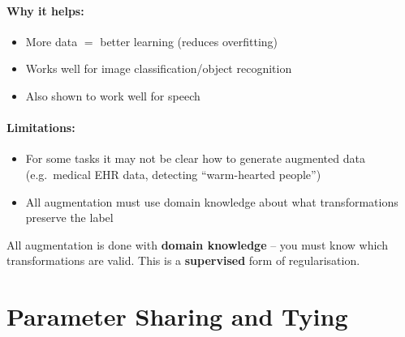 \documentclass[12pt,a4paper]{article}
\begin{document}
\paragraph{Why it helps:}
\begin{itemize}
  \item More data $=$ better learning (reduces overfitting)
  \item Works well for image classification/object recognition
  \item Also shown to work well for speech
\end{itemize}

\paragraph{Limitations:}
\begin{itemize}
  \item For some tasks it may not be clear how to generate augmented data (e.g.\ medical EHR data, detecting ``warm-hearted people'')
  \item All augmentation must use domain knowledge about what transformations preserve the label
\end{itemize}

\begin{notebox}
All augmentation is done with \textbf{domain knowledge} -- you must know which transformations are valid. This is a \textbf{supervised} form of regularisation.
\end{notebox}

\section{Parameter Sharing and Tying}
\end{document}
